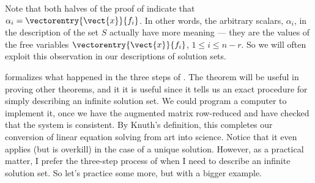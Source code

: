 %
Note that both halves of the proof of  indicate that $\alpha_i=\vectorentry{\vect{x}}{f_i}$.  In other words, the arbitrary scalars, $\alpha_i$, in the description of the set $S$ actually have more meaning --- they are the values of the free variables $\vectorentry{\vect{x}}{f_i}$, $1\leq i\leq n-r$.  So we will often exploit this observation in our descriptions of solution sets.\par
%
 formalizes what happened in the three steps of .  The theorem will be useful in proving other theorems, and it it is useful since it tells us an exact procedure for simply describing an infinite solution set.  We could program a computer to implement it, once we have the augmented matrix row-reduced and have checked that the system is consistent.  By Knuth's definition, this completes our conversion of linear equation solving from art into science.  Notice that it even applies (but is overkill) in the case of a unique solution.  However, as a practical matter, I prefer the three-step process of  when I need to describe an infinite solution set.  So let's practice some more, but with a bigger example.
%
